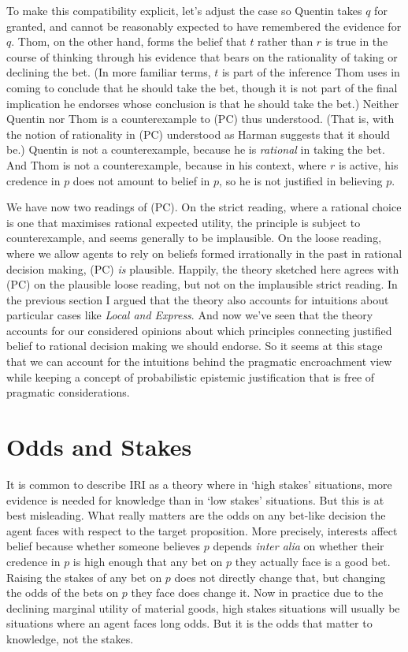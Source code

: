 To make this compatibility explicit, let's adjust the case so Quentin takes \(q\) for granted, and cannot be reasonably expected to have remembered the evidence for \(q\). Thom, on the other hand, forms the belief that \(t\) rather than \(r\) is true in the course of thinking through his evidence that bears on the rationality of taking or declining the bet. (In more familiar terms, \(t\) is part of the inference Thom uses in coming to conclude that he should take the bet, though it is not part of the final implication he endorses whose conclusion is that he should take the bet.) Neither Quentin nor Thom is a counterexample to (PC) thus understood. (That is, with the notion of rationality in (PC) understood as Harman suggests that it should be.) Quentin is not a counterexample, because he is \textit{rational} in taking the bet. And Thom is not a counterexample, because in his context, where \(r\) is active, his credence in \(p\) does not amount to belief in \(p\), so he is not justified in believing \(p\).

We have now two readings of (PC). On the strict reading, where a rational choice is one that maximises rational expected utility, the principle is subject to counterexample, and seems generally to be implausible. On the loose reading, where we allow agents to rely on beliefs formed irrationally in the past in rational decision making, (PC) \textit{is} plausible. Happily, the theory sketched here agrees with (PC) on the plausible loose reading, but not on the implausible strict reading. In the previous section I argued that the theory also accounts for intuitions about particular cases like \textit{Local and Express}. And now we've seen that the theory accounts for our considered opinions about which principles connecting justified belief to rational decision making we should endorse. So it seems at this stage that we can account for the intuitions behind the pragmatic encroachment view while keeping a concept of probabilistic epistemic justification that is free of pragmatic considerations.

\section{Odds and Stakes}

It is common to describe IRI as a theory where in `high stakes' situations, more evidence is needed for knowledge than in `low stakes' situations. But this is at best misleading. What really matters are the odds on any bet-like decision the agent faces with respect to the target proposition. More precisely, interests affect belief because  whether someone believes \(p\) depends \textit{inter alia} on whether their credence in \(p\) is high enough that any bet on \(p\) they actually face is a good bet. Raising the stakes of any bet on \(p\) does not directly change that, but changing the odds of the bets on \(p\) they face does change it. Now in practice due to the declining marginal utility of material goods, high stakes situations will usually be situations where an agent faces long odds. But it is the odds that matter to knowledge, not the stakes.

